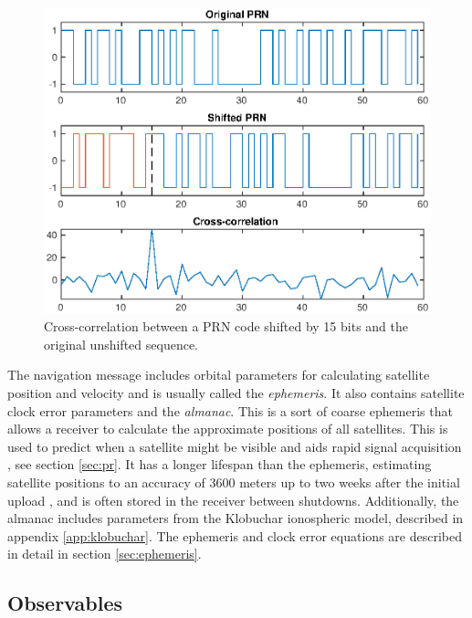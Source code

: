 \begin{figure}[!htbp]
    \centering
    \includegraphics[scale=0.7]{bilder/prn_autocorr.eps}
    \caption{Cross-correlation between a PRN code shifted by 15 bits and the original unshifted sequence.}
    \label{fig:prn-match}
\end{figure}

The navigation message includes orbital parameters for calculating satellite position and velocity and is usually called the \textit{ephemeris}. It also contains satellite clock error parameters and the \textit{almanac}. This is a sort of coarse ephemeris that allows a receiver to calculate the approximate positions of all satellites. This is used to predict when a satellite might be visible and aids rapid signal acquisition \cite{misra2006global}, see section \ref{sec:pr}. It has a longer lifespan than the ephemeris, estimating satellite positions to an accuracy of 3600 meters up to two weeks after the initial upload \cite{groves2013principles}, and is often stored in the receiver between shutdowns. Additionally, the almanac includes parameters from the Klobuchar ionospheric model, described in appendix \ref{app:klobuchar}. The ephemeris and clock error equations are described in detail in section \ref{sec:ephemeris}.
    
\subsection{Observables}
